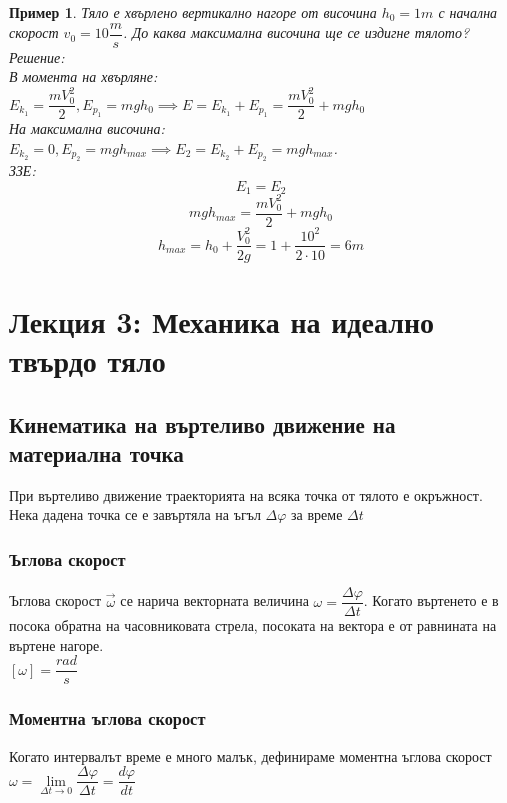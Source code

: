 \documentclass[fleqn]{article}
\newtheorem{example}{Пример}[subsection]
\begin{document}
\begin{example}
Тяло е хвърлено вертикално нагоре от височина $h_0 =  1m$ с начална скорост $v_0 = 10 \dfrac{m}{s}$. До каква максимална височина ще се издигне тялото?\\
Решение:\\
В момента на хвърляне: \\
$E_{k_1} = \dfrac{mV_0^2}{2}, E_{p_1} = mgh_0 \implies E = E_{k_1} + E_{p_1} =  \dfrac{mV_0^2}{2} + mgh_0 $ \\
На максимална височина: \\
$E_{k_2} = 0 , E_{p_2} = mgh_{max} \implies E_2 = E_{k_2} + E_{p_2} =  mgh_{max} $. \\
ЗЗЕ: 
$$E_1 = E_2$$
$$mgh_{max} = \dfrac{mV_0^2}{2} + mgh_0  $$
$$h_{max} = h_0 + \dfrac{V_0^2}{2g} = 1 + \dfrac{10^2}{2 \cdot 10} = 6m$$
\end{example}


\newpage
\section{Лекция 3: Механика на идеално твърдо тяло}

\subsection{Кинематика на въртеливо движение на материална точка}
При въртеливо движение траекторията на всяка точка от тялото е окръжност. Нека дадена точка се е завъртяла на ъгъл $\Delta \varphi$
за време $\Delta t$

\subsubsection{Ъглова скорост}
Ъглова скорост $\vec{\omega}$ се нарича векторната величина $\omega = \dfrac{\Delta \varphi}{\Delta t}$. Когато въртенето е в посока обратна на часовниковата стрела, посоката на вектора е от равнината на въртене нагоре. \\
$\left[ \omega \right] = \dfrac{rad}{s}$

\subsubsection{Моментна ъглова скорост}
Когато интервалът време е много малък, дефинираме моментна ъглова скорост $\omega = \lim\limits_{\Delta t \rightarrow 0} \dfrac{\Delta \varphi}{\Delta t} = \dfrac{d \varphi}{dt}$
\end{document}
